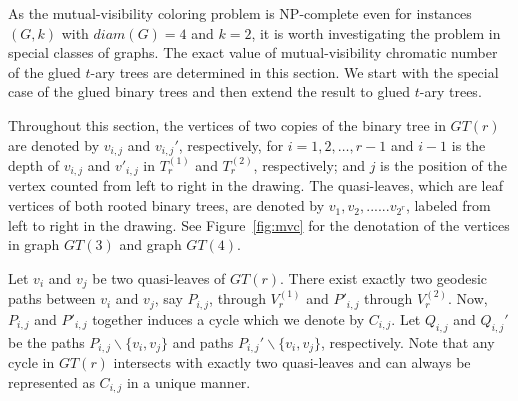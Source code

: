 \documentclass[12pt]{article}
\begin{document}
As the mutual-visibility coloring problem is NP-complete even for instances $(G, k)$ with $diam(G) = 4$ and $k = 2$, it is worth investigating the problem in special classes of graphs. The exact value of mutual-visibility chromatic number of the glued $t$-ary trees are determined in this section. We start with the special case of the glued binary trees and then extend the result to glued $t$-ary trees. \par
Throughout this section, the vertices of two copies of the binary tree in $GT(r)$ are denoted by $v_{i,j}$ and $v_{i,j}'$, respectively, for $i = 1, 2, \ldots, r - 1$ and $i-1$ is the depth of $v_{i,j}$ and $v'_{i,j}$ in $T_r^{(1)}$ and $T_r^{(2)}$, respectively; and $j$ is the position of the vertex counted from left to right in the drawing.  The quasi-leaves, which are leaf vertices of both rooted binary trees, are denoted by $v_1,v_2,......v_{2^r}$, labeled from left to right in the drawing.  See Figure~\ref{fig:mvc} for the denotation of the vertices in graph $GT(3)$ and graph $GT(4)$.

Let $v_i$ and $v_j$ be two quasi-leaves of $GT(r)$. There exist exactly two geodesic paths between $v_i$ and $v_j$, say $P_{i,j}$, through $V_r^{(1)}$ and $P'_{i,j}$ through $V_r^{(2)}$. Now, $P_{i,j}$ and $P'_{i,j}$ together induces a cycle which we denote by $C_{i,j}$. Let $Q_{i,j}$ and $Q_{i,j}'$ be the paths $P_{i,j} \backslash \{v_i,v_j\}$ and paths $P_{i,j}' \backslash \{v_i,v_j\}$, respectively. Note that any cycle in $GT(r)$ intersects with exactly two quasi-leaves and can always be represented as $C_{i,j}$ in a unique manner.\par
\end{document}
